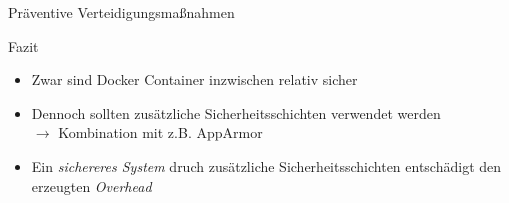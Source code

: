 \begin{frame}{Präventive Verteidigungsmaßnahmen}
  \begin{block}{Fazit}
    \begin{itemize}[<+->]
      \item Zwar sind Docker Container inzwischen relativ sicher
      \item Dennoch sollten zusätzliche Sicherheitsschichten verwendet werden \\
      $\rightarrow$ Kombination mit z.B. AppArmor
      \item Ein \textit{sichereres System} druch zusätzliche Sicherheitsschichten entschädigt den erzeugten \textit{Overhead}
    \end{itemize}
  \end{block}
\end{frame}
